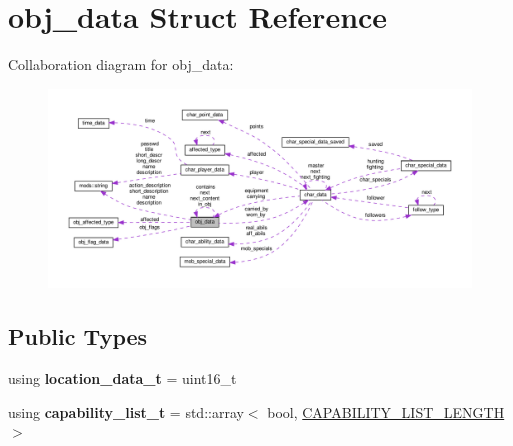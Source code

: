 \hypertarget{structobj__data}{}\section{obj\+\_\+data Struct Reference}
\label{structobj__data}


Collaboration diagram for obj\+\_\+data\+:
\nopagebreak
\begin{figure}[H]
\begin{center}
\leavevmode
\includegraphics[width=350pt]{structobj__data__coll__graph}
\end{center}
\end{figure}
\subsection*{Public Types}
\begin{DoxyCompactItemize}
\item 
\mbox{\label{structobj__data_a16fb22b0d504f5d6913e1feffa21bcca}} 
using {\bfseries location\+\_\+data\+\_\+t} = uint16\+\_\+t
\item 
\mbox{\label{structobj__data_a607271510be271e80a6ced59870730dd}} 
using {\bfseries capability\+\_\+list\+\_\+t} = std\+::array$<$ bool, \hyperlink{structobj__data_a8cefe6b9b7e5e568f4cf758e60db2ce2}{C\+A\+P\+A\+B\+I\+L\+I\+T\+Y\+\_\+\+L\+I\+S\+T\+\_\+\+L\+E\+N\+G\+TH} $>$
\end{DoxyCompactItemize}
